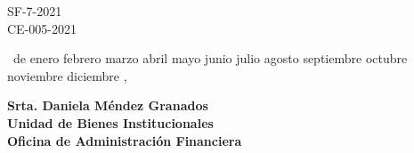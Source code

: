 \documentclass[12pt]{article}
\newcommand{\MONTH}{%
  \ifcase\the\month
  \or enero%
  \or febrero%
  \or marzo%
  \or abril%
  \or mayo%
  \or junio%
  \or julio%
  \or agosto%
  \or septiembre%
  \or octubre%
  \or noviembre%
  \or diciembre%
  \fi}
\begin{document}
\begin{flushright}
  \begin{spacing}{1}
  SF-7-2021\\
  CE-005-2021\\
  \end{spacing}
  \medskip
  \the\day\ de \MONTH, \the\year
\end{flushright}
\medskip
\begin{flushleft}\begin{spacing}{1}
  \textbf{Srta. Daniela Méndez Granados\\
  Unidad de Bienes Institucionales\\
  Oficina de Administración Financiera}
\end{spacing}\end{flushleft}
\end{document}

